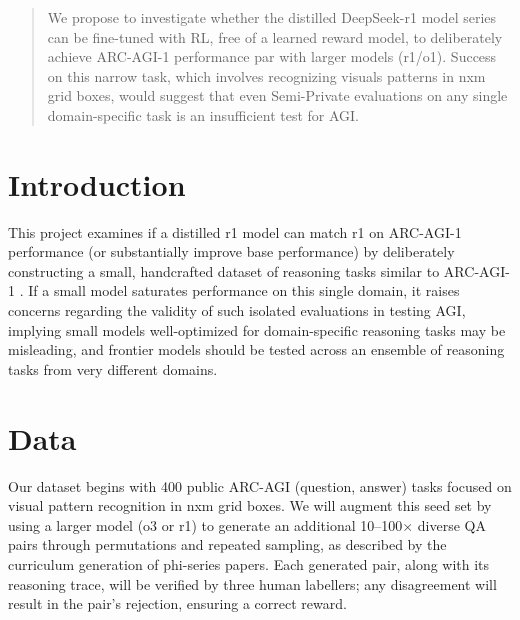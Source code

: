 \documentclass{article}
\begin{document}

\printAffiliationsAndNotice{}

\begin{abstract}
  We propose to investigate whether the distilled DeepSeek-r1 model series can be fine-tuned with RL, free of a learned reward model, to deliberately achieve ARC-AGI-1 performance par with larger models (r1/o1). Success on this narrow task, which involves recognizing visuals patterns in nxm grid boxes, would suggest that even Semi-Private evaluations on any single domain-specific task is an insufficient test for AGI.
\end{abstract}

\section{Introduction}
This project examines if a distilled r1 model can match r1 on ARC-AGI-1 performance (or substantially improve base performance) by deliberately constructing a small, handcrafted dataset of reasoning tasks similar to ARC-AGI-1 \cite{ARC-AGI, r1}. If a small model saturates performance on this single domain, it raises concerns regarding the validity of such isolated evaluations in testing AGI, implying small models well-optimized for domain-specific reasoning tasks may be misleading, and frontier models should be tested across an ensemble of reasoning tasks from very different domains.

\section{Data}
Our dataset begins with 400 public ARC-AGI (question, answer) tasks focused on visual pattern recognition in nxm grid boxes. We will augment this seed set by using a larger model (o3 or r1) to generate an additional 10--100$\times$ diverse QA pairs through permutations and repeated sampling, as described by the curriculum generation of phi-series papers. Each generated pair, along with its reasoning trace, will be verified by three human labellers; any disagreement will result in the pair's rejection, ensuring a correct reward.
\end{document}

